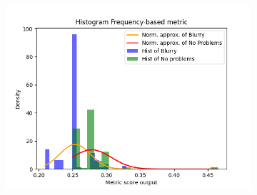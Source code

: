 \begin{figure}[H]
\begin{subfigure}[t]{0.48\textwidth}
        \caption{}
        \label{fig:HF_thresh}
    \end{subfigure}\hspace{1em}
    \begin{subfigure}[t]{0.48\textwidth}
        \includegraphics[width=\textwidth]{Figures/results_on_thresholds/output_dens_hf.png}
        \caption{}
        \label{fig:HF_dens}
    \end{subfigure}\hspace{1em}
    \caption{}
    \label{fig:HF_final}
\end{figure}

